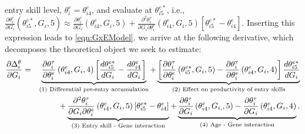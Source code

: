 \documentclass[12pt,a4paper]{article}
\begin{document}
\begin{bibunit}
{entry skill level, $\theta^{e}_i=\theta_{i4}^{e}$, and evaluate  at $\theta_{i5}^{e*}$, i.e.,
$\frac{\partial \theta_{i}^{\tau}}{\partial G_i}\left(\theta_{i 5}^{e*}, G_{i}, 5\right) \approx  \frac{\partial \theta_{i}^{\tau}}{\partial G_i}\left(\theta_{i 4}^{e}, G_{i}, 5\right) + \frac{\partial^2 \theta_{i}^{\tau}}{\partial G_i \partial \theta_{i}^e}\left(\theta_{i 4}^{e}, G_{i}, 5\right)\left[\theta_{i5}^{e*}-\theta_{i4}^{e}\right]$. Inserting this expression leads to \autoref{eqn:GxEModel}.} we arrive at the following derivative, which decomposes the theoretical object we seek to estimate:
\begin{eqnarray}
\frac{\partial \Delta_{i}^{\theta}}{\partial G_{i}} &=& \underbrace{\frac{\partial \theta_{i}^\tau}{\partial \theta_{i}^e}\left(\theta_{i 4}^{e}, G_{i}, 4\right) \left[\frac{d \theta_{i 5}^{e*}}{d G_i}-\frac{d \theta_{i 4}^e}{d G_i}\right]}_{\text{(1) Differential pre-entry accumulation}} + \underbrace{{\left[\frac{\partial \theta_{i}^\tau}{\partial \theta_{i}^e}\left(\theta_{i5}^{e*}, G_{i}, 5\right)-\frac{\partial \theta_{i}^\tau}{\partial \theta_{i}^e}\left(\theta_{i 4}^e, G_{i},4\right)\right] \frac{d \theta_{i 5}^{e *} }{d G_i} }}_{\text{(2) Effect on productivity of entry skills}} \notag \\
 &&\:\: + \underbrace{\frac{\partial^2 \theta_{i}^\tau}{\partial G_i \partial \theta_{i}^e}\left(\theta_{i 4}^{e}, G_{i}, 5\right)\left[\theta_{i 5}^{e*}-\theta_{i 4}^e\right]}_{\text{(3) Entry skill - Gene interaction}}
 +  \underbrace{\frac{\partial \theta_{i}^\tau}{\partial G_i}\left(\theta^e_{i 4}, G_{i,}, 5\right)-\frac{\partial \theta_{i}^\tau}{\partial G_i}\left(\theta^e_{i 4}, G_i, 4\right)}_{\text{(4) Age - Gene interaction}}.
\label{eqn:GxEModel}
\end{eqnarray}


\end{bibunit}
\end{document}
